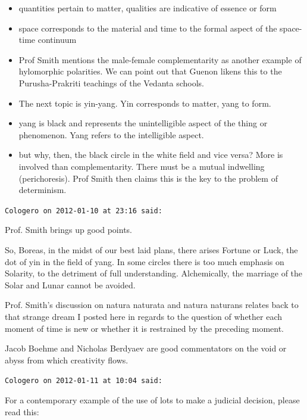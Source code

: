 \begin{footnotesize}
\begin{sffamily}
\begin{itemize}


\item quantities pertain to matter, qualities are indicative of essence or form

\item space corresponds to the material and time to the formal aspect of the space-time continuum

\item Prof Smith mentions the male-female complementarity as another example of hylomorphic polarities. We can point out that Guenon likens this to the Purusha-Prakriti teachings of the Vedanta schools.

\item The next topic is yin-yang. Yin corresponds to matter, yang to form.

\item yang is black and represents the unintelligible aspect of the thing or phenomenon. Yang refers to the intelligible aspect.

\item but why, then, the black circle in the white field and vice versa? More is involved than complementarity. There must be a mutual indwelling (perichoresis). Prof Smith then claims this is the key to the problem of determinism.
\end{itemize}


\hfill

\texttt{Cologero on 2012-01-10 at 23:16 said:}

Prof. Smith brings up good points.

So, Boreas, in the midst of our best laid plans, there arises Fortune or Luck, the dot of yin in the field of yang. In some circles there is too much emphasis on Solarity, to the detriment of full understanding. Alchemically, the marriage of the Solar and Lunar cannot be avoided.

Prof. Smith's discussion on natura naturata and natura naturans relates back to that strange dream I posted here in regards to the question of whether each moment of time is new or whether it is restrained by the preceding moment.

Jacob Boehme and Nicholas Berdyaev are good commentators on the void or abyss from which creativity flows.

\hfill

\texttt{Cologero on 2012-01-11 at 10:04 said:}

For a contemporary example of the use of lots to make a judicial decision, please read this:


\end{sffamily}
\end{footnotesize}

